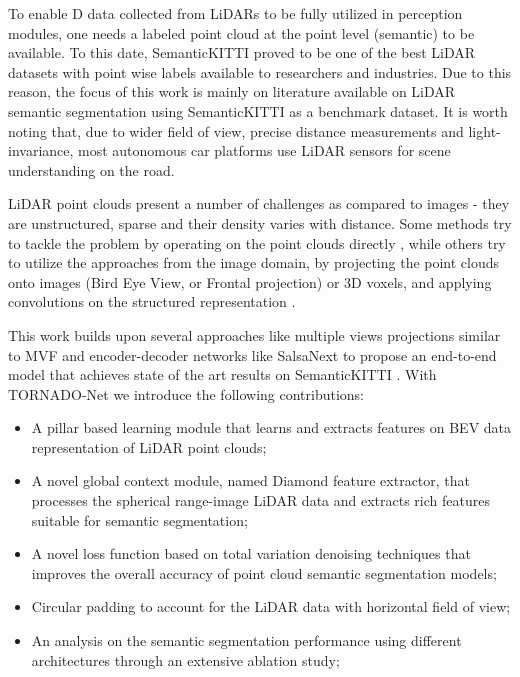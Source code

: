 \documentclass{article}
\begin{document}
To enable D data collected from LiDARs to be fully utilized in perception modules, one needs a labeled point cloud at the point level (semantic) to be available. To this date, SemanticKITTI \cite{DBLP:conf/iccv/BehleyGMQBSG19} proved to be one of the best LiDAR datasets with point wise labels available to researchers and industries. Due to this reason, the focus of this work is mainly on literature available on LiDAR semantic segmentation using SemanticKITTI \cite{DBLP:conf/iccv/BehleyGMQBSG19} as a benchmark dataset. It is worth noting that, due to wider field of view, precise distance measurements and light-invariance, most autonomous car platforms use LiDAR sensors for scene understanding on the road. 


LiDAR point clouds present a number of challenges as compared to images - they are unstructured, sparse and their density varies with distance. Some methods try to tackle the problem by operating on the point clouds directly \cite{qi2017pointnet}, while others try to utilize the approaches from the image domain, by projecting the point clouds onto images (Bird Eye View, or Frontal projection) or 3D voxels, and applying convolutions on the structured representation \cite{wu2018squeezeseg}.

This work builds upon several approaches like multiple views projections similar to MVF \cite{zhou2020end} and encoder-decoder networks like SalsaNext \cite{cortinhal2020salsanext} to propose an end-to-end model that achieves state of the art results on SemanticKITTI \cite{DBLP:conf/iccv/BehleyGMQBSG19}. With TORNADO-Net we introduce the following contributions:
\begin{itemize}
  \item A pillar based learning module that learns and extracts features on BEV data representation of LiDAR point clouds;
  \item A novel global context module, named Diamond feature extractor, that processes the spherical range-image LiDAR data and extracts rich features suitable for semantic segmentation;
\item A novel loss function based on total variation denoising techniques that improves the overall accuracy of point cloud semantic segmentation models;
  \item Circular padding to account for the LiDAR data with  horizontal field of view;
\item An analysis on the semantic segmentation performance using different architectures through an extensive ablation study;
\end{itemize}
\end{document}
